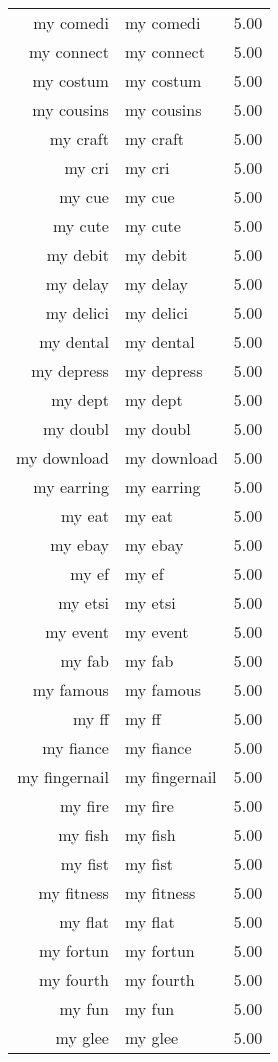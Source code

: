 \begin{table}[ht]
\begin{tabular}{rlr}
  my comedi & my comedi & 5.00 \\ 
  my connect & my connect & 5.00 \\ 
  my costum & my costum & 5.00 \\ 
  my cousins & my cousins & 5.00 \\ 
  my craft & my craft & 5.00 \\ 
  my cri & my cri & 5.00 \\ 
  my cue & my cue & 5.00 \\ 
  my cute & my cute & 5.00 \\ 
  my debit & my debit & 5.00 \\ 
  my delay & my delay & 5.00 \\ 
  my delici & my delici & 5.00 \\ 
  my dental & my dental & 5.00 \\ 
  my depress & my depress & 5.00 \\ 
  my dept & my dept & 5.00 \\ 
  my doubl & my doubl & 5.00 \\ 
  my download & my download & 5.00 \\ 
  my earring & my earring & 5.00 \\ 
  my eat & my eat & 5.00 \\ 
  my ebay & my ebay & 5.00 \\ 
  my ef & my ef & 5.00 \\ 
  my etsi & my etsi & 5.00 \\ 
  my event & my event & 5.00 \\ 
  my fab & my fab & 5.00 \\ 
  my famous & my famous & 5.00 \\ 
  my ff & my ff & 5.00 \\ 
  my fiance & my fiance & 5.00 \\ 
  my fingernail & my fingernail & 5.00 \\ 
  my fire & my fire & 5.00 \\ 
  my fish & my fish & 5.00 \\ 
  my fist & my fist & 5.00 \\ 
  my fitness & my fitness & 5.00 \\ 
  my flat & my flat & 5.00 \\ 
  my fortun & my fortun & 5.00 \\ 
  my fourth & my fourth & 5.00 \\ 
  my fun & my fun & 5.00 \\ 
  my glee & my glee & 5.00 \\ 

\end{tabular}
\end{table}
